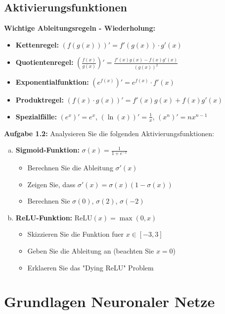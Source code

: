 ﻿\documentclass[12pt,a4paper]{article}
\begin{document}
\subsection{Aktivierungsfunktionen}

\textbf{Wichtige Ableitungsregeln - Wiederholung:}
\begin{itemize}
    \item \textbf{Kettenregel:} $(f(g(x)))' = f'(g(x)) \cdot g'(x)$
    \item \textbf{Quotientenregel:} $\left(\frac{f(x)}{g(x)}\right)' = \frac{f'(x)g(x) - f(x)g'(x)}{(g(x))^2}$
    \item \textbf{Exponentialfunktion:} $(e^{f(x)})' = e^{f(x)} \cdot f'(x)$
    \item \textbf{Produktregel:} $(f(x) \cdot g(x))' = f'(x)g(x) + f(x)g'(x)$
    \item \textbf{Spezialfälle:} $(e^x)' = e^x$, $(\ln(x))' = \frac{1}{x}$, $(x^n)' = nx^{n-1}$
\end{itemize}

\textbf{Aufgabe 1.2:} Analysieren Sie die folgenden Aktivierungsfunktionen:

\begin{enumerate}[(a)]
    \item \textbf{Sigmoid-Funktion:} $\sigma(x) = \frac{1}{1 + e^{-x}}$
    \begin{itemize}
        \item Berechnen Sie die Ableitung $\sigma'(x)$
        \item Zeigen Sie, dass $\sigma'(x) = \sigma(x)(1 - \sigma(x))$
        \item Berechnen Sie $\sigma(0)$, $\sigma(2)$, $\sigma(-2)$
    \end{itemize}
    
    \item \textbf{ReLU-Funktion:} $\text{ReLU}(x) = \max(0, x)$
    \begin{itemize}
        \item Skizzieren Sie die Funktion fuer $x \in [-3, 3]$
        \item Geben Sie die Ableitung an (beachten Sie $x = 0$)
        \item Erklaeren Sie das "Dying ReLU" Problem
    \end{itemize}
\end{enumerate}

\section{Grundlagen Neuronaler Netze}
\end{document}
